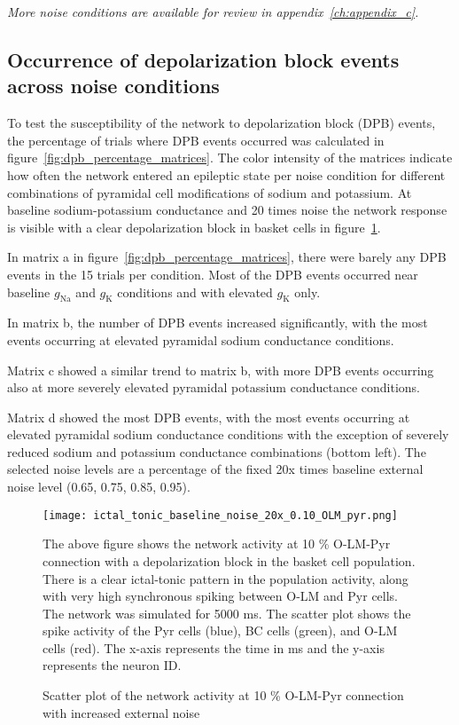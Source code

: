 \noindent
\textit{More noise conditions are available for review in appendix~\ref{ch:appendix_c}.}

\subsection{Occurrence of depolarization block events across noise conditions}
To test the susceptibility of the network to depolarization block (DPB) events, the percentage of trials where DPB events occurred was calculated in figure~\ref{fig:dpb_percentage_matrices}.
The color intensity of the matrices indicate how often the network entered an epileptic state per noise condition for different combinations of pyramidal cell modifications of sodium and potassium.
At baseline sodium-potassium conductance and 20 times noise the network response is visible with a clear depolarization block in basket cells in figure~\ref{fig:scatterplot_1_con_olm_pyr_ext_noise_20x}.

In matrix a in figure~\ref{fig:dpb_percentage_matrices}, there were barely any DPB events in the 15 trials per condition. Most of the DPB events occurred near baseline \(g_{\text{Na}}\) and \(g_{\text{K}}\) conditions and with elevated \(g_{\text{K}}\) only.

In matrix b, the number of DPB events increased significantly, with the most events occurring at elevated pyramidal sodium conductance conditions.

Matrix c showed a similar trend to matrix b, with more DPB events occurring also at more severely elevated pyramidal potassium conductance conditions.

Matrix d showed the most DPB events, with the most events occurring at elevated pyramidal sodium conductance conditions with the exception of severely reduced sodium and potassium conductance combinations (bottom left).
The selected noise levels are a percentage of the fixed 20x times baseline external noise level (0.65, 0.75, 0.85, 0.95).

\begin{figure}[htbp]
    \centering
    \texttt{[image: ictal\_tonic\_baseline\_noise\_20x\_0.10\_OLM\_pyr.png]}
    \caption[10 \% O-LM-Pyr connection with increased external noise scatter plot]{Scatter plot of the network activity at 10 \% O-LM-Pyr connection with increased external noise}\label{fig:scatterplot_1_con_olm_pyr_ext_noise_20x}
    \begin{minipage}{1.0\textwidth}
        The above figure shows the network activity at 10 \% O-LM-Pyr connection with a depolarization block in the basket cell population.
        There is a clear ictal-tonic pattern in the population activity, along with very high synchronous spiking between O-LM and Pyr cells.
        The network was simulated for 5000 ms. 
        The scatter plot shows the spike activity of the Pyr cells (blue), BC cells (green), and O-LM cells (red). 
        The x-axis represents the time in ms and the y-axis represents the neuron ID\@. 
    \end{minipage}
\end{figure}
\pagebreak

